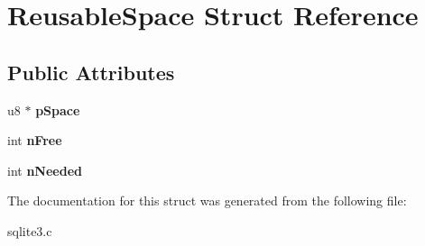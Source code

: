 \hypertarget{structReusableSpace}{}\section{Reusable\+Space Struct Reference}
\label{structReusableSpace}
\subsection*{Public Attributes}
\begin{DoxyCompactItemize}
\item 
u8 $\ast$ {\bfseries p\+Space}\hypertarget{structReusableSpace_a457bb011e90fd7c4eb61c79925720981}{}\label{structReusableSpace_a457bb011e90fd7c4eb61c79925720981}

\item 
int {\bfseries n\+Free}\hypertarget{structReusableSpace_a0be5d91e907e20632e3f508e34fb7989}{}\label{structReusableSpace_a0be5d91e907e20632e3f508e34fb7989}

\item 
int {\bfseries n\+Needed}\hypertarget{structReusableSpace_ac67d036d43ab721121af005f5ce88199}{}\label{structReusableSpace_ac67d036d43ab721121af005f5ce88199}

\end{DoxyCompactItemize}


The documentation for this struct was generated from the following file\+:\begin{DoxyCompactItemize}
\item 
sqlite3.\+c\end{DoxyCompactItemize}
